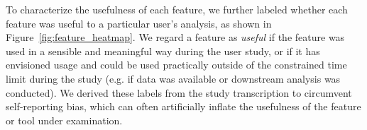 To characterize the usefulness of each feature, we further labeled whether each feature was useful to a particular user's analysis, as shown in Figure~\ref{fig:feature_heatmap}. We regard a feature as \textit{useful} if the feature was used in a sensible and meaningful way during the user study, or if it has envisioned usage and could be used practically outside of the constrained time limit during the study (e.g. if data was available or downstream analysis was conducted).
We derived these labels from the study transcription to circumvent self-reporting bias, which can often artificially inflate the usefulness of the feature or tool under examination.
